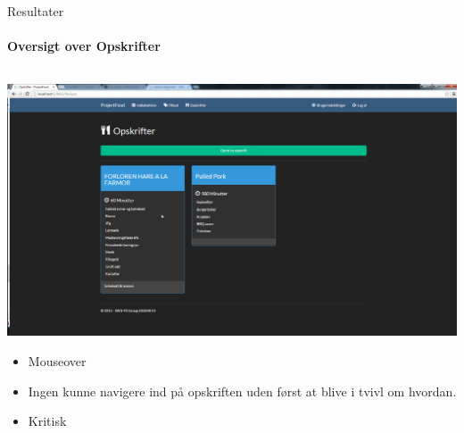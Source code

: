 \begin{frame}{Resultater}
\framesubtitle{Oversigt over Opskrifter}

	
	\begin{minipage}[0.3\textheight]{\textwidth}
	\begin{columns}[T]
	\begin{column}{1\textwidth}
	 \includegraphics[width=1\textwidth,height=1\textheight,keepaspectratio, trim={1cm 0 0 16mm}, clip]{images/Screenshots/RecipeOld.png}
	 
	 	\begin{itemize}
	 	\item Mouseover
	 	\item Ingen kunne navigere ind på opskriften uden først at blive i tvivl om hvordan.
	 	\item Kritisk
	 	
	 	\end{itemize}
	
	\end{column}

	\end{columns}

  \end{minipage}
	
\end{frame}

